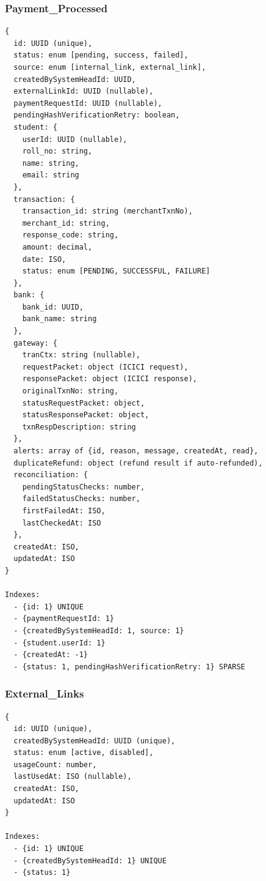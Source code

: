 \documentclass[12pt,a4paper]{article}
\begin{document}
\subsubsection{Payment\_Processed}
\begin{lstlisting}
{
  id: UUID (unique),
  status: enum [pending, success, failed],
  source: enum [internal_link, external_link],
  createdBySystemHeadId: UUID,
  externalLinkId: UUID (nullable),
  paymentRequestId: UUID (nullable),
  pendingHashVerificationRetry: boolean,
  student: {
    userId: UUID (nullable),
    roll_no: string,
    name: string,
    email: string
  },
  transaction: {
    transaction_id: string (merchantTxnNo),
    merchant_id: string,
    response_code: string,
    amount: decimal,
    date: ISO,
    status: enum [PENDING, SUCCESSFUL, FAILURE]
  },
  bank: {
    bank_id: UUID,
    bank_name: string
  },
  gateway: {
    tranCtx: string (nullable),
    requestPacket: object (ICICI request),
    responsePacket: object (ICICI response),
    originalTxnNo: string,
    statusRequestPacket: object,
    statusResponsePacket: object,
    txnRespDescription: string
  },
  alerts: array of {id, reason, message, createdAt, read},
  duplicateRefund: object (refund result if auto-refunded),
  reconciliation: {
    pendingStatusChecks: number,
    failedStatusChecks: number,
    firstFailedAt: ISO,
    lastCheckedAt: ISO
  },
  createdAt: ISO,
  updatedAt: ISO
}

Indexes:
  - {id: 1} UNIQUE
  - {paymentRequestId: 1}
  - {createdBySystemHeadId: 1, source: 1}
  - {student.userId: 1}
  - {createdAt: -1}
  - {status: 1, pendingHashVerificationRetry: 1} SPARSE
\end{lstlisting}

\subsubsection{External\_Links}
\begin{lstlisting}
{
  id: UUID (unique),
  createdBySystemHeadId: UUID (unique),
  status: enum [active, disabled],
  usageCount: number,
  lastUsedAt: ISO (nullable),
  createdAt: ISO,
  updatedAt: ISO
}

Indexes:
  - {id: 1} UNIQUE
  - {createdBySystemHeadId: 1} UNIQUE
  - {status: 1}
\end{lstlisting}
\end{document}
